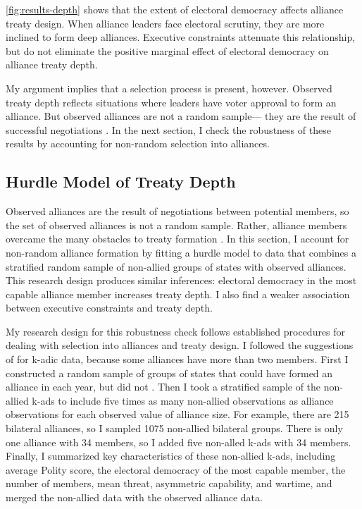 \documentclass[12pt]{article}
\begin{document}
\autoref{fig:results-depth} shows that the extent of electoral democracy affects alliance treaty design.
When alliance leaders face electoral scrutiny, they are more inclined to form deep alliances. 
Executive constraints attenuate this relationship, but do not eliminate the positive marginal effect of electoral democracy on alliance treaty depth. 


My argument implies that a selection process is present, however. 
Observed treaty depth reflects situations where leaders have voter approval to form an alliance.
But observed alliances are not a random sample--- they are the result of successful negotiations \citep{Poast2019a}. 
In the next section, I check the robustness of these results by accounting for non-random selection into alliances. 


\subsection{Hurdle Model of Treaty Depth} 


Observed alliances are the result of negotiations between potential members, so the set of observed alliances is not a random sample.
Rather, alliance members overcame the many obstacles to treaty formation \citep{Poast2019a}.  
In this section, I account for non-random alliance formation by fitting a hurdle model to data that combines a stratified random sample of non-allied groups of states with observed alliances. 
This research design produces similar inferences: electoral democracy in the most capable alliance member increases treaty depth. 
I also find a weaker association between executive constraints and treaty depth. 


My research design for this robustness check follows established procedures for dealing with selection into alliances and treaty design. 
I followed the suggestions of \citet{Poast2010} for k-adic data, because some alliances have more than two members. 
First I constructed a random sample of groups of states that could have formed an alliance in each year, but did not \citep{FordhamPoast2014}.
Then I took a stratified sample of the non-allied k-ads to include five times as many non-allied observations as alliance observations for each observed value of alliance size. 
For example, there are 215 bilateral alliances, so I sampled 1075 non-allied bilateral groups. 
There is only one alliance with 34 members, so I added five non-alled k-ads with 34 members. 
Finally, I summarized key characteristics of these non-allied k-ads, including average Polity score, the electoral democracy of the most capable member, the number of members, mean threat, asymmetric capability, and wartime, and merged the non-allied data with the observed alliance data. 
\end{document}

